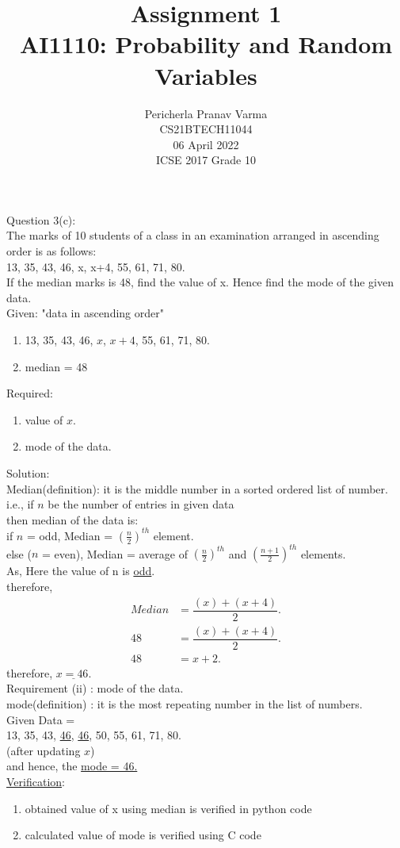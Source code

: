\documentclass[journal,12pt,twocolumn]{IEEEtran}
\title{Assignment 1 \\ \Large AI1110: Probability and Random Variables \\ }
\author{Pericherla Pranav Varma \\ \normalsize CS21BTECH11044 \\ \vspace*{20pt} \normalsize  06 April 2022 \\ \vspace*{20pt} \Large ICSE 2017 Grade 10}
\begin{document}
\maketitle
\doublespacing
Question 3(c):\\
The marks of 10 students of a class in an examination arranged in ascending order
is as follows:\\
13, 35, 43, 46, x, x+4, 55, 61, 71, 80.\\
If the median marks is 48, find the value of x. Hence find the mode of the given
data.\\[9pt]
Given: "data in ascending order"
\begin{enumerate}[label=(\roman*)]
	\item 13, 35, 43, 46, $x$, $x+4$, 55, 61, 71, 80.
	\item median = 48
\end{enumerate}
Required: 
\begin{enumerate}[label=(\roman*)]	
	\item value of $x$.
	\item mode of the data.
\end{enumerate}
Solution:\\[8pt]
Median(definition): it is the middle number in a sorted ordered list of number. \\
i.e., if $n$ be the number of entries in given data\\
then median of the data is:\\
if $n$ = odd, Median = $(\frac{n}{2})^{th}$ element.\\
else ($n$ = even), Median = average of $(\frac{n}{2})^{th}$ and $(\frac{n+1}{2})^{th}$ elements.\\[6pt]
As, Here the value of n is \underline{odd}.\\
	therefore,\\
	\begin{align}
	Median &= \dfrac{(x)+(x+4)}{2}.\\
	  48 &= \dfrac{(x)+(x+4)}{2}.\\
	  48 &= x+2.
	\end{align}	
	therefore, $ \underline{x=46.}$ \\[10pt]
Requirement (ii) : mode of the data. \\[4pt]
mode(definition) : it is the most repeating number in the list of numbers.\\[2pt]
Given 	Data = \\13, 35, 43, \underline{46}, \underline{46}, 50, 55, 61, 71, 80.\\(after updating $x$)\\
and hence, the \underline{mode = 46.}\\
\underline{Verification}:
\begin{enumerate}[label=(\roman*)]
	\item obtained value of x using median is verified in python code
	\item calculated value of mode is verified using C code
\end{enumerate}
\end{document}
